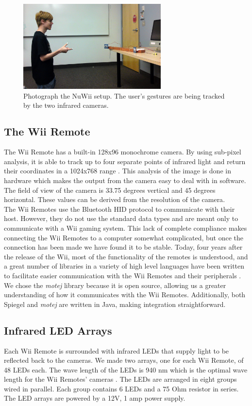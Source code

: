 \documentclass[a4paper,twoside]{article}
\begin{document}
 
\begin{figure}[h] \begin{center} \includegraphics[width = 7.5cm]{setup}
\end{center} \caption{Photograph the NuWii setup. The user's gestures are being
tracked by the two infrared cameras.} \label{setup} \end{figure}
 
\subsection{The Wii Remote} The Wii Remote has a built-in 128x96 monochrome
camera. By using sub-pixel analysis, it is able to track up to four separate
points of infrared light and return their coordinates in a 1024x768 range
\cite{WiiBrew10}. This analysis of the image is done in hardware which makes
the output from the camera easy to deal with in software. The field of view of
the camera is 33.75 degrees vertical and 45 degrees horizontal. These values
can be derived from the resolution of the camera\cite{Lee08}. \\

The Wii Remotes use the Bluetooth HID protocol to communicate with their host.
However, they do not use the standard data types and are meant only to
communicate with a Wii gaming system. This lack of complete compliance makes
connecting the Wii Remotes to a computer somewhat complicated, but once the
connection has been made we have found it to be stable. Today, four years after
the release of the Wii, most of the functionality of the remotes is understood,
and a great number of libraries in a variety of high level languages have been
written to facilitate easier communication with the Wii Remotes and their
peripherals \cite{WiiBrew10}. We chose the \emph{motej} library because it is
open source, allowing us a greater understanding of how it communicates with
the Wii Remotes.  Additionally, both Spiegel and \emph{motej} are written in
Java, making integration straightforward.

\subsection{Infrared LED Arrays} Each Wii Remote is surrounded with infrared
LEDs that supply light to be reflected back to the cameras. We made two arrays,
one for each Wii Remote, of 48 LEDs each. The wave length of the LEDs is 940 nm
which is the optimal wave length for the Wii Remotes' cameras \cite{WiiBrew10}.
The LEDs are arranged in eight groups wired in parallel. Each group contains 6
LEDs and a 75 Ohm resistor in series. The LED arrays are powered by a 12V, 1
amp power supply.
 
\end{document}
